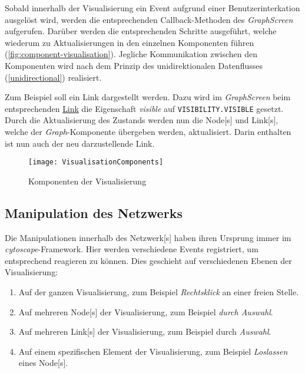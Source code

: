 Sobald innerhalb der Visualisierung ein \gls{Event} aufgrund einer Benutzerinterkation ausgelöst wird, werden die entsprechenden \gls{Callback}-Methoden des \textit{GraphScreen} aufgerufen. Darüber werden die entsprechenden Schritte ausgeführt, welche wiederum zu Aktualisierungen in den einzelnen Komponenten führen (\autoref{fig:component-visualisation}). Jegliche Kommunikation zwischen den Komponenten wird nach dem Prinzip des unidirektionalen Datenflusses (\autoref{unidirectional}) realisiert.

Zum Beispiel soll ein \gls{Link} dargestellt werden. Dazu wird im \textit{GraphScreen} beim entsprechenden \hyperref[GraphLinkElement]{Link} die Eigenschaft \textit{visible} auf \texttt{VISI\-BILI\-TY.VISI\-BLE} gesetzt. Durch die Aktualisierung des Zustands werden nun die \gls{Node}[s] und \gls{Link}[s], welche der \textit{Graph}-Komponente übergeben werden, aktualisiert. Darin enthalten ist nun auch der neu darzustellende Link.

\begin{figure}[htbp]
\centerline{\texttt{[image: VisualisationComponents]}}
\caption{Komponenten der Visualisierung}
\label{fig:component-visualisation}
\end{figure}


\subsection{Manipulation des Netzwerks}
\label{subsec:graph-manipulation}

Die Manipulationen innerhalb des \gls{Netzwerk}[s] haben ihren Ursprung immer im \textit{cytoscape}-Framework. Hier werden verschiedene \gls{Event}s registriert, um entsprechend reagieren zu können. Dies geschieht auf verschiedenen Ebenen der Visualisierung:
\begin{enumerate}
    \item Auf der ganzen Visualisierung, zum Beispiel \textit{Rechtsklick} an einer freien Stelle.
    \item Auf mehreren \gls{Node}[s] der Visualisierung, zum Beispiel \textit{durch Auswahl}.
    \item Auf mehreren \gls{Link}[s] der Visualisierung, zum Beispiel durch \textit{Auswahl}.
    \item Auf einem spezifischen Element der Visualisierung, zum Beispiel \textit{Loslassen} eines \gls{Node}[s].
\end{enumerate}



